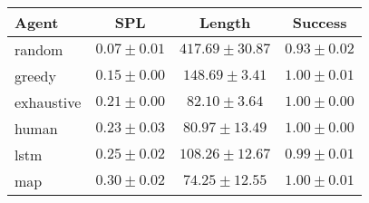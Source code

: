 \begin{tabular}{lccc}
    \toprule
    Agent & SPL & Length & Success \\
    \midrule
    random & $0.07 \pm 0.01$ & $417.69 \pm 30.87$ & $0.93 \pm 0.02$\\
    greedy & $0.15 \pm 0.00$ & $148.69 \pm 3.41$ & $1.00 \pm 0.01$\\
    exhaustive & $0.21 \pm 0.00$ & $82.10 \pm 3.64$ & $1.00 \pm 0.00$\\
    human & $0.23 \pm 0.03$ & $80.97 \pm 13.49$ & $1.00 \pm 0.00$\\
    lstm & $0.25 \pm 0.02$ & $108.26 \pm 12.67$ & $0.99 \pm 0.01$\\
    map & $0.30 \pm 0.02$ & $74.25 \pm 12.55$ & $1.00 \pm 0.01$\\
    \bottomrule
\end{tabular}
